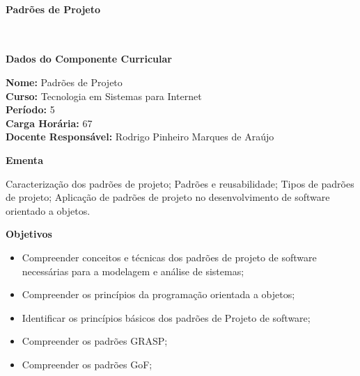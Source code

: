 \paragraph{Padrões de Projeto} \


\begin{snugshade}\begin{center}\textbf{
	Dados do Componente Curricular
}\end{center}\end{snugshade}

\noindent 	\textbf{Nome:} Padrões de Projeto
\\ 			\textbf{Curso:} Tecnologia em Sistemas para Internet
\\ 			\textbf{Período:} \unit{5}{\degree}
\\ 			\textbf{Carga Horária:} \unit{67}{\hour}
\\ 			\textbf{Docente Responsável:} Rodrigo Pinheiro Marques de Araújo


\begin{snugshade}\begin{center}\textbf{
    Ementa
\vphantom{q}}\end{center}\end{snugshade}

\noindent
Caracterização dos padrões de projeto; Padrões e reusabilidade; Tipos de padrões de projeto; Aplicação de padrões de projeto no desenvolvimento de software orientado a objetos.


\begin{snugshade}\begin{center}\textbf{
    Objetivos
}\end{center}\end{snugshade}


\begin{itemize}

\item Compreender conceitos e técnicas dos padrões de projeto de software necessárias para a modelagem e análise de sistemas;
\item Compreender os princípios da programação orientada a objetos;
\item Identificar os princípios básicos dos padrões de Projeto de software;
\item Compreender os padrões GRASP;
\item Compreender os padrões GoF;

\end{itemize}

